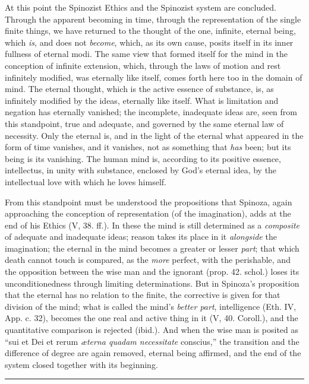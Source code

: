 \documentclass[12pt,a4paper,openany]{book}
\newcommand{\opage}[1]{\marginnote{\footnotesize\textit{[#1]}}}
\begin{document}
At this point the Spinozist Ethics and the Spinozist
system are concluded. Through the apparent
becoming in time, through the representation of the single finite
things, we have returned to the thought of the one,
infinite, eternal being, which \emph{is}, and does not \emph{become}, which, as
its own cause, posits itself in its inner fullness of eternal
modi. The same view that formed itself for the mind
in the conception of infinite extension, which, through
the laws of motion and rest infinitely modified, was eternally
like itself, comes forth here too in the domain of mind.
The eternal thought, which is the active essence of substance, is,
as infinitely modified by the ideas, eternally like itself.
What is limitation and negation has eternally vanished;
the incomplete, inadequate ideas are, seen from this standpoint,
true and adequate, and governed by the same eternal
law of necessity. Only the eternal is, and in the light of the eternal
what appeared in the form of time vanishes, and it
vanishes, not as something that \emph{has} been; but its being
is its vanishing. The human mind is, according to its
positive essence, intellectus, in unity with substance, enclosed
by God's eternal idea, by the intellectual love
with which he loves himself.

From this standpoint must be understood the propositions that
Spinoza, again approaching the conception of representation (of the imagination),
adds at the end of his Ethics (V, 38. ff.).
In these the mind is still determined as a \emph{composite}
of adequate and inadequate ideas; reason takes
its place in it \emph{alongside} the imagination; the eternal in
the mind becomes a greater or lesser \emph{part}; that which death
cannot touch is compared, as the \emph{more} perfect,
with the perishable, and the opposition between the wise man
and the ignorant (prop. 42. schol.) loses its unconditionedness
through limiting determinations. But in Spinoza's proposition
that the eternal has no relation to the finite,
\opage{171} the corrective is given for that division of the mind; what is called
the mind's \emph{better part}, intelligence (Eth. IV, App. c. 32),
becomes the one real and active thing in it (V, 40. Coroll.),
and the quantitative comparison is rejected (ibid.).
And when the wise man is posited as ``sui et Dei et rerum \emph{æterna
quadam necessitate} conscius,'' the transition and the difference of degree
are again removed, eternal being affirmed, and the end of the system closed
together with its beginning.

\bigskip
\begin{center}\rule{2.5cm}{0.4pt}\end{center}
\bigskip
\end{document}
